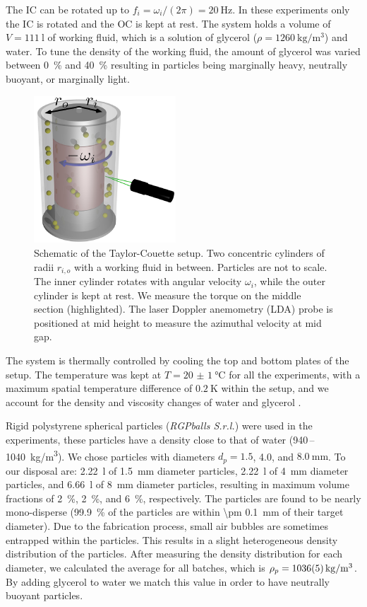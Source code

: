 The IC can be rotated up to $f_i = \omega_i/(2\pi) =
\SI{20}{\hertz}$. In these experiments only the IC is rotated and the OC is
kept at rest. The system holds a volume of $V = \SI{111}{\litre}$ of working
fluid, which is a solution of glycerol ($\rho =
\SI{1260}{\kilo\gram/\metre\cubed}$) and water. To tune the density of the
working fluid, the amount of glycerol was varied between \SI{0}{\percent} and
\SI{40}{\percent} resulting in particles being marginally heavy,
neutrally buoyant, or marginally light.
\begin{figure}
\centering
\includegraphics[height=5.5cm]{figure1.pdf}
\caption{
Schematic of the Taylor-Couette setup. Two concentric cylinders of radii
$r_{i,o}$ with a working fluid in between. Particles are not to scale. The
inner cylinder rotates with angular velocity $\omega_i$, while the outer
cylinder is kept at rest. We measure the torque on the middle section
(highlighted). The laser Doppler anemometry (LDA) probe is positioned at mid
height to measure the azimuthal velocity at mid gap.}
\label{fig:setup}
\end{figure}
The system is thermally controlled by cooling the top and bottom plates of the
setup. The temperature was kept at $T = \SI{20(1)}{\celsius}$ for all the
experiments, with a maximum spatial temperature difference of
$\SI{0.2}{\kelvin}$ within the setup, and we account for the density and
viscosity changes of water and glycerol \citep{Glycerine1963}.

Rigid polystyrene spherical particles (\textit{RGPballs S.r.l.}) were used in
the experiments, these particles have a density close to that of water
(940\,--\SI{1040}{\kilo\gram/\metre\cubed}). We chose particles with diameters
$d_p = 1.5$, 4.0, and $\SI{8.0}{\milli\metre}$. To our disposal are:
\SI{2.22}{\litre} of \SI{1.5}{\milli\metre} diameter particles,
\SI{2.22}{\litre} of \SI{4}{\milli\metre} diameter particles, and
\SI{6.66}{\litre} of \SI{8}{\milli\metre} diameter particles, resulting in
maximum volume fractions of \SI{2}{\percent}, \SI{2}{\percent}, and
\SI{6}{\percent}, respectively. The particles are found to be nearly
mono-disperse (\SI{99.9}{\percent} of the particles are within \SI{\pm
0.1}{\milli\metre} of their target diameter). Due to the fabrication process,
small air bubbles are sometimes entrapped within the particles. This results
in a slight heterogeneous density distribution of the particles. After
measuring the density distribution for each diameter, we calculated the
average for all batches, which is $\rho_p = \SI{1036 \pm
5}{\kilo\gram/\metre\cubed}$. By adding glycerol to water we match this value
in order to have neutrally buoyant particles.

